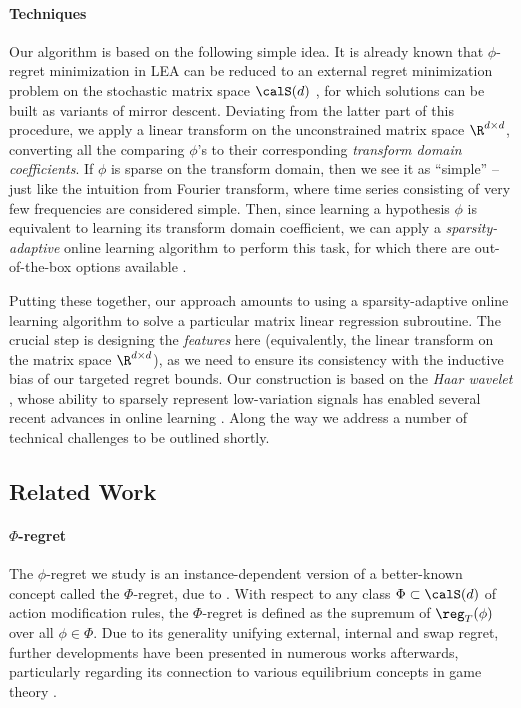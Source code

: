 \documentclass[10pt]{article}
\begin{document}
\paragraph{Techniques} Our algorithm is based on the following simple idea. It is already known that $\phi$-regret minimization in LEA can be reduced to an external regret minimization problem on the stochastic matrix space $\calS(d)$ \citep{gordon2008no}, for which solutions can be built as variants of mirror descent. Deviating from the latter part of this procedure, we apply a linear transform on the unconstrained matrix space $\R^{d\times d}$, converting all the comparing $\phi$'s to their corresponding \emph{transform domain coefficients}. If $\phi$ is sparse on the transform domain, then we see it as ``simple'' -- just like the intuition from Fourier transform, where time series consisting of very few frequencies are considered simple. Then, since learning a hypothesis $\phi$ is equivalent to learning its transform domain coefficient, we can apply a \emph{sparsity-adaptive} online learning algorithm to perform this task, for which there are out-of-the-box options available \citep[Chapter~9]{orabona2023modern}. 

Putting these together, our approach amounts to using a sparsity-adaptive online learning algorithm to solve a particular matrix linear regression subroutine. The crucial step is designing the \emph{features} here (equivalently, the linear transform on the matrix space $\R^{d\times d}$), as we need to ensure its consistency with the inductive bias of our targeted regret bounds. Our construction is based on the \emph{Haar wavelet} \citep{mallat2008wavelet}, whose ability to sparsely represent low-variation signals has enabled several recent advances in online learning \citep{baby2019online,zhang2023unconstrained,jacobsen2024equivalence}. Along the way we address a number of technical challenges to be outlined shortly. 

\subsection{Related Work}

\paragraph{$\Phi$-regret} The $\phi$-regret we study is an instance-dependent version of a better-known concept called the $\Phi$-regret, due to \cite{greenwald2003general}. With respect to any class $\Phi\subset\calS(d)$ of action modification rules, the $\Phi$-regret is defined as the supremum of $\reg_T(\phi)$ over all $\phi\in\Phi$. Due to its generality unifying external, internal and swap regret, further developments have been presented in numerous works afterwards, particularly regarding its connection to various equilibrium concepts in game theory \citep{stoltz2007learning,rakhlin2011online,piliouras2022evolutionary,bernasconi2023constrained,cai2024tractable,zhang2024efficient}. 
\end{document}
